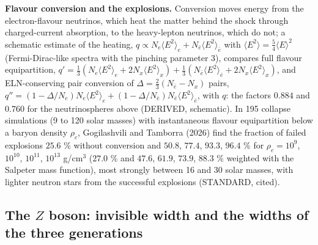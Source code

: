 \documentclass[
  10pt,
]{article}
\begin{document}
\textbf{Flavour conversion and the explosions.} Conversion moves energy
from the electron-flavour neutrinos, which heat the matter behind the
shock through charged-current absorption, to the heavy-lepton neutrinos,
which do not; a schematic estimate of the heating,
\(q \propto N_e\langle E^2\rangle_e + N_{\bar e}\langle E^2\rangle_{\bar e}\)
with \(\langle E^2\rangle = \frac54\langle E\rangle^2\)
(Fermi-Dirac-like spectra with the pinching parameter 3), compares full
flavour equipartition,
\(q' = \frac13(N_e\langle E^2\rangle_e + 2N_x\langle E^2\rangle_x) + \frac13(N_{\bar e}\langle E^2\rangle_{\bar e} + 2N_x\langle E^2\rangle_x)\),
and ELN-conserving pair conversion of
\(\Delta = \frac23(N_{\bar e} - N_x)\) pairs,
\(q'' = (1 - \Delta/N_e)N_e\langle E^2\rangle_e + (1 - \Delta/N_{\bar e})N_{\bar e}\langle E^2\rangle_{\bar e}\),
with \(q\): the factors \(0.884\) and \(0.760\) for the neutrinospheres
above (DERIVED, schematic). In 195 collapse simulations (9 to 120 solar
masses) with instantaneous flavour equipartition below a baryon density
\(\rho_c\), Gogilashvili and Tamborra (2026) find the fraction of failed
explosions \(25.6\) \% without conversion and \(50.8\), \(77.4\),
\(93.3\), \(96.4\) \% for \(\rho_c = 10^9\), \(10^{10}\), \(10^{11}\),
\(10^{13}\) g/cm\(^3\) (\(27.0\) \% and \(47.6\), \(61.9\), \(73.9\),
\(88.3\) \% weighted with the Salpeter mass function), most strongly
between 16 and 30 solar masses, with lighter neutron stars from the
successful explosions (STANDARD, cited).

\hypertarget{the-z-boson-invisible-width-and-the-widths-of-the-three-generations}{%
\subsection{\texorpdfstring{The \(Z\) boson: invisible width and the
widths of the three
generations}{The Z boson: invisible width and the widths of the three generations}}\label{the-z-boson-invisible-width-and-the-widths-of-the-three-generations}}
\end{document}

